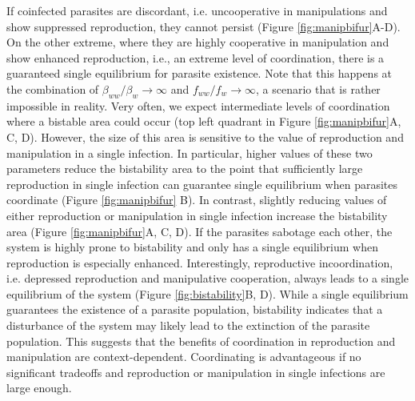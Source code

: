 \documentclass[a4paper]{scrartcl}
\begin{document}
If coinfected parasites are discordant, i.e. uncooperative in manipulations and show suppressed reproduction, they cannot persist (Figure \ref{fig:manipbifur}A-D). 
On the other extreme, where they are highly cooperative in manipulation and show enhanced reproduction, i.e., an extreme level of coordination, there is a guaranteed single equilibrium for parasite existence. 
Note that this happens at the combination of $\beta_{ww}/\beta_w \rightarrow \infty$ and $f_{ww}/f_w \rightarrow \infty$, a scenario that is rather impossible in reality. 
Very often, we expect intermediate levels of coordination where a bistable area could occur (top left quadrant in Figure \ref{fig:manipbifur}A, C, D).
However, the size of this area is sensitive to the value of reproduction and manipulation in a single infection. 
In particular, higher values of these two parameters reduce the bistability area to the point that sufficiently large reproduction in single infection can guarantee single equilibrium when parasites coordinate (Figure \ref{fig:manipbifur} B).
In contrast, slightly reducing values of either reproduction or manipulation in single infection increase the bistability area (Figure \ref{fig:manipbifur}A, C, D).
If the parasites sabotage each other, the system is highly prone to bistability and only has a single equilibrium when reproduction is especially enhanced.
Interestingly, reproductive incoordination, i.e. depressed reproduction and manipulative cooperation, always leads to a single equilibrium of the system (Figure \ref{fig:bistability}B, D). 
While a single equilibrium guarantees the existence of a parasite population, bistability indicates that a disturbance of the system may likely lead to the extinction of the parasite population. 
This suggests that the benefits of coordination in reproduction and manipulation are context-dependent. 
Coordinating is advantageous if no significant tradeoffs and reproduction or manipulation in single infections are large enough. 
\end{document}
